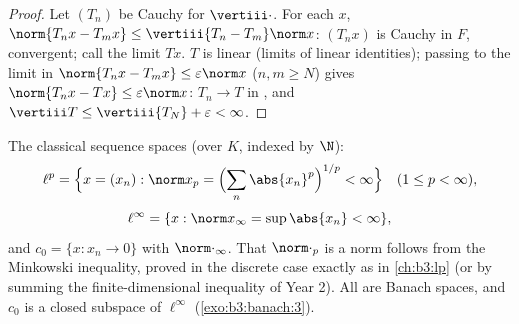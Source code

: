 \begin{proof}
Let $(T_n)$ be Cauchy for $\vertiii\cdot$. For each $x$,
$\norm{T_nx - T_mx} \leq \vertiii{T_n - T_m}\norm x$: $(T_nx)$
is Cauchy in $F$, convergent; call the limit $Tx$. $T$ is
linear (limits of linear identities); passing to the limit in
$\norm{T_nx - T_mx} \leq \varepsilon\norm x$ ($n, m \geq N$)
gives $\norm{T_nx - Tx} \leq \varepsilon\norm x$: $T_n \to T$
in , and $\vertiii T \leq \vertiii{T_N} +
\varepsilon < \infty$.
\end{proof}

\begin{definition}\label{def:b3:banach:lp}
The classical sequence spaces
(over $K$, indexed by $\N$):
\[
\ell^p = \Bigl\{x = (x_n) : \norm x_p = \Bigl(\sum_n
\abs{x_n}^p\Bigr)^{1/p} < \infty\Bigr\}\quad (1 \leq p <
\infty),
\]
\[
\ell^\infty = \{x : \norm x_\infty = \sup\abs{x_n} < \infty\},
\]
and $c_0 = \{x : x_n \to 0\}$ with $\norm\cdot_\infty$. That
$\norm\cdot_p$ is a norm follows from the Minkowski inequality,
proved in the discrete case exactly as in \cref{ch:b3:lp} (or
by summing the finite-dimensional inequality of Year 2). All
are Banach spaces, and $c_0$ is a closed subspace of
$\ell^\infty$ (\cref{exo:b3:banach:3}).
\end{definition}

